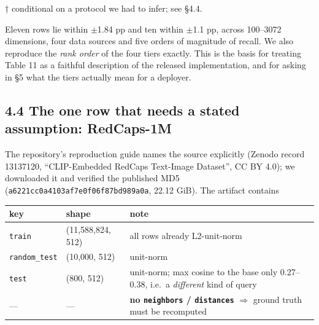 \documentclass[
  10pt,
]{article}
\newcounter{none} %
\begin{document}
† conditional on a protocol we had to infer; see §4.4.

Eleven rows lie within $\pm$1.84 pp and ten within $\pm$1.1 pp, across 100--3072
dimensions, four data sources and five orders of magnitude of recall. We
also reproduce the \emph{rank order} of the four tiers exactly. This is
the basis for treating Table 11 as a faithful description of the
released implementation, and for asking in §5 what the tiers actually
mean for a deployer.

\subsection{4.4 The one row that needs a stated assumption:
RedCaps-1M}\label{the-one-row-that-needs-a-stated-assumption-redcaps-1m}

The repository's reproduction guide names the source explicitly (Zenodo
record 13137120, ``CLIP-Embedded RedCaps Text-Image Dataset'', CC BY
4.0); we downloaded it and verified the published MD5
(\texttt{a6221cc0a4103af7e0f06f87bd989a0a}, 22.12 GiB). The artifact
contains

{\def\LTcaptype{none} %
\begin{longtable}[]{@{}
  >{\raggedright\arraybackslash}p{}
  >{\raggedright\arraybackslash}p{}
  >{\raggedright\arraybackslash}p{}@{}}
\toprule\noalign{}
\begin{minipage}[b]{\linewidth}\raggedright
key
\end{minipage} & \begin{minipage}[b]{\linewidth}\raggedright
shape
\end{minipage} & \begin{minipage}[b]{\linewidth}\raggedright
note
\end{minipage} \\
\midrule\noalign{}
\endhead
\bottomrule\noalign{}
\endlastfoot
\texttt{train} & (11,588,824, 512) & all rows already L2-unit-norm \\
\texttt{random\_test} & (10,000, 512) & unit-norm \\
\texttt{test} & (800, 512) & unit-norm; max cosine to the base only
0.27--0.38, i.e.~a \emph{different} kind of query \\
--- & --- & \textbf{no \texttt{neighbors} / \texttt{distances}} $\Rightarrow$ ground
truth must be recomputed \\
\end{longtable}
}
\end{document}
